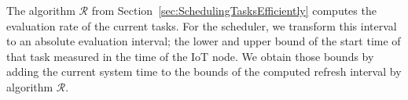 \documentclass[runningheads]{llncs}
\newcommand{\CleanInline}[1]{\lstinline[language=Clean]!#1!}
\newcommand{\prog}[1]{\CleanInline{#1}}
\begin{document}



The algorithm $\mathcal{R}$ from Section~\ref{sec:SchedulingTasksEfficiently} computes the evaluation rate of the current tasks.
For the scheduler, we transform this interval to an absolute evaluation interval; the lower and upper bound of the start time of that task measured in the time of the IoT node.
We obtain those bounds by adding the current system time to the bounds of the computed refresh interval by algorithm $\mathcal{R}$.
\end{document}
